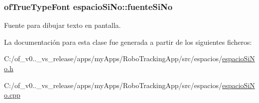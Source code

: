 \subsubsection[{fuente\+Si\+No}]{\setlength{\rightskip}{0pt plus 5cm}of\+True\+Type\+Font espacio\+Si\+No\+::fuente\+Si\+No\hspace{0.3cm}{\ttfamily [private]}}\label{classespacio_si_no_a820d421658b6ebc4f6d09673014a60f2}


Fuente para dibujar texto en pantalla. 



La documentación para esta clase fue generada a partir de los siguientes ficheros\+:\begin{DoxyCompactItemize}
\item 
C\+:/of\+\_\+v0..\+\_\+vs\+\_\+release/apps/my\+Apps/\+Robo\+Tracking\+App/src/espacios/\hyperlink{espacio_si_no_8h}{espacio\+Si\+No.\+h}\item 
C\+:/of\+\_\+v0..\+\_\+vs\+\_\+release/apps/my\+Apps/\+Robo\+Tracking\+App/src/espacios/\hyperlink{espacio_si_no_8cpp}{espacio\+Si\+No.\+cpp}\end{DoxyCompactItemize}
